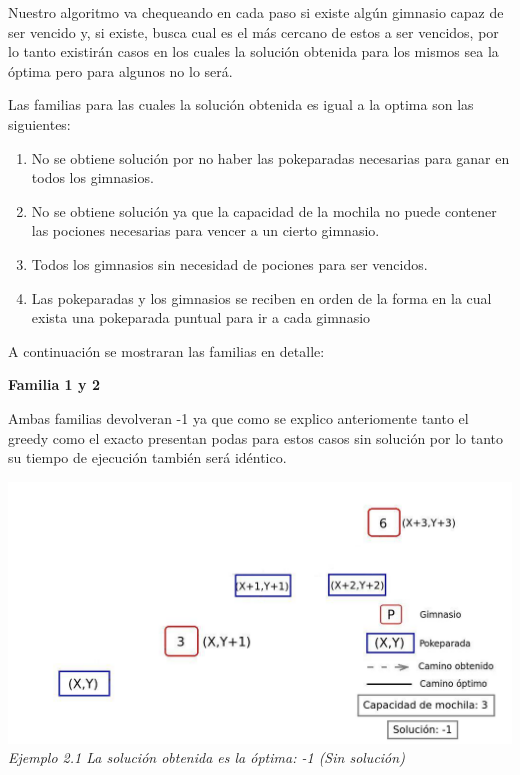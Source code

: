 Nuestro algoritmo va chequeando en cada paso si existe alg\'un gimnasio capaz de ser vencido y, si existe, busca cual es el m\'as cercano de estos a ser vencidos, por lo tanto existir\'an casos en los cuales la soluci\'on obtenida para los mismos sea la \'optima pero para algunos no lo ser\'a.

Las familias para las cuales la solución obtenida es igual a la optima son las siguientes:

\begin{enumerate}
\item No se obtiene soluci\'on por no haber las pokeparadas necesarias para ganar en todos los gimnasios.
\item No se obtiene soluci\'on ya que la capacidad de la mochila no puede contener las pociones necesarias para vencer a un cierto gimnasio.
\item Todos los gimnasios sin necesidad de pociones para ser vencidos.
\item Las pokeparadas y los gimnasios se reciben en orden de la forma en la cual exista una pokeparada puntual para ir a cada gimnasio
\end{enumerate}

A continuaci\'on se mostraran las familias en detalle:\\

\begin{center}
\textbf{Familia 1 y 2}
\end{center}

Ambas familias devolveran -1 ya que como se explico anteriomente tanto el greedy como el exacto presentan podas para estos casos sin soluci\'on por lo tanto su tiempo de ejecuci\'on tambi\'en ser\'a id\'entico.

\vspace*{0.3cm} \vspace*{0.3cm}
  \begin{center}
\includegraphics[scale=0.60]{./EJ2/sinSolucion.jpeg}
\\{\textit{Ejemplo 2.1 La soluci\'on obtenida es la \'optima: -1 (Sin soluci\'on)}}
  \end{center}
  \vspace*{0.3cm}
  
